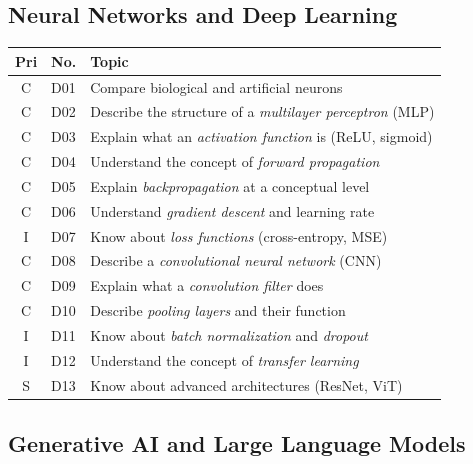 \documentclass[11pt,a4paper]{article}
\begin{document}
\subsection{Neural Networks and Deep Learning}

\begin{longtable}{@{}clp{9cm}@{}}
\toprule
\textbf{Pri} & \textbf{No.} & \textbf{Topic} \\
\midrule
\endfirsthead
\midrule
\endhead
\midrule
\endfoot
\bottomrule
\endlastfoot
C & D01 & Compare biological and artificial neurons \\
C & D02 & Describe the structure of a \emph{multilayer perceptron} (MLP) \\
C & D03 & Explain what an \emph{activation function} is (ReLU, sigmoid) \\
C & D04 & Understand the concept of \emph{forward propagation} \\
C & D05 & Explain \emph{backpropagation} at a conceptual level \\
C & D06 & Understand \emph{gradient descent} and learning rate \\
I & D07 & Know about \emph{loss functions} (cross-entropy, MSE) \\
C & D08 & Describe a \emph{convolutional neural network} (CNN) \\
C & D09 & Explain what a \emph{convolution filter} does \\
C & D10 & Describe \emph{pooling layers} and their function \\
I & D11 & Know about \emph{batch normalization} and \emph{dropout} \\
I & D12 & Understand the concept of \emph{transfer learning} \\
S & D13 & Know about advanced architectures (ResNet, ViT) \\
\end{longtable}

\subsection{Generative AI and Large Language Models}
\end{document}
